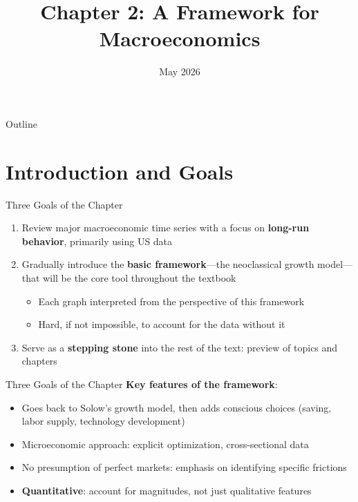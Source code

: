\documentclass[blue]{beamer}
\title[Chapter2]{Chapter 2: A Framework for Macroeconomics}
\author[]{}
\date[May 2026]{May 2026}
\begin{document}
  \frame
  {
    \titlepage
  }


\begin{frame}{Outline}
	\tableofcontents
\end{frame}

\section{Introduction and Goals}

\begin{frame}{Three Goals of the Chapter}
	\begin{enumerate}
		\item Review major macroeconomic time series with a focus on \textbf{long-run behavior}, primarily using US data
		\item Gradually introduce the \textbf{basic framework}---the neoclassical growth model---that will be the core tool throughout the textbook
		\begin{itemize}
			\item Each graph interpreted from the perspective of this framework
			\item Hard, if not impossible, to account for the data without it
		\end{itemize}
		\item Serve as a \textbf{stepping stone} into the rest of the text: preview of topics and chapters
	\end{enumerate}
\end{frame}	
\begin{frame}{Three Goals of the Chapter}
	\textbf{Key features of the framework}:
	\begin{itemize}
		\item Goes back to Solow's growth model, then adds conscious choices (saving, labor supply, technology development)
		\item Microeconomic approach: explicit optimization, cross-sectional data
		\item No presumption of perfect markets: emphasis on identifying specific frictions
		\item \textbf{Quantitative}: account for magnitudes, not just qualitative features
	\end{itemize}
\end{frame}
\end{document}
